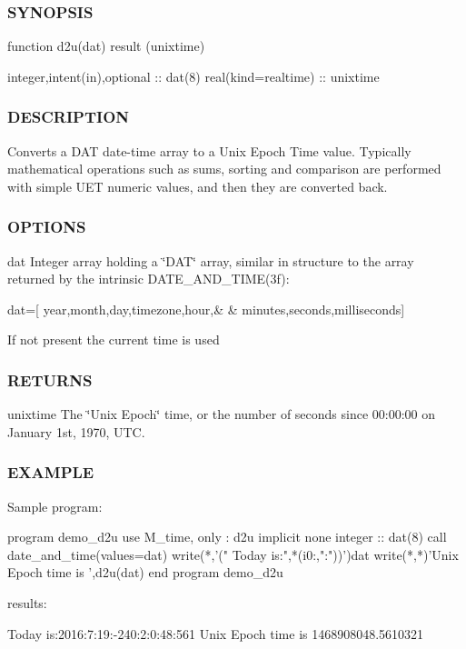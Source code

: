 \subsubsection*{S\+Y\+N\+O\+P\+S\+IS}

\begin{DoxyVerb}function d2u(dat) result (unixtime)

   integer,intent(in),optional :: dat(8)
   real(kind=realtime)         :: unixtime
\end{DoxyVerb}


\subsubsection*{D\+E\+S\+C\+R\+I\+P\+T\+I\+ON}

Converts a D\+AT date-\/time array to a Unix Epoch Time value. Typically mathematical operations such as sums, sorting and comparison are performed with simple U\+ET numeric values, and then they are converted back.

\subsubsection*{O\+P\+T\+I\+O\+NS}

dat Integer array holding a \char`\"{}\+D\+A\+T\char`\"{} array, similar in structure to the array returned by the intrinsic D\+A\+T\+E\+\_\+\+A\+N\+D\+\_\+\+T\+I\+M\+E(3f)\+: \begin{DoxyVerb}   dat=[ year,month,day,timezone,hour,&
    & minutes,seconds,milliseconds]
\end{DoxyVerb}


If not present the current time is used

\subsubsection*{R\+E\+T\+U\+R\+NS}

unixtime The \char`\"{}\+Unix Epoch\char`\"{} time, or the number of seconds since 00\+:00\+:00 on January 1st, 1970, U\+TC.

\subsubsection*{E\+X\+A\+M\+P\+LE}

\begin{DoxyVerb}Sample program:

 program demo_d2u
 use M_time, only : d2u
 implicit none
 integer           :: dat(8)
    call date_and_time(values=dat)
    write(*,'(" Today is:",*(i0:,":"))')dat
    write(*,*)'Unix Epoch time is ',d2u(dat)
 end program demo_d2u

results:

 Today is:2016:7:19:-240:2:0:48:561
 Unix Epoch time is    1468908048.5610321
\end{DoxyVerb}
